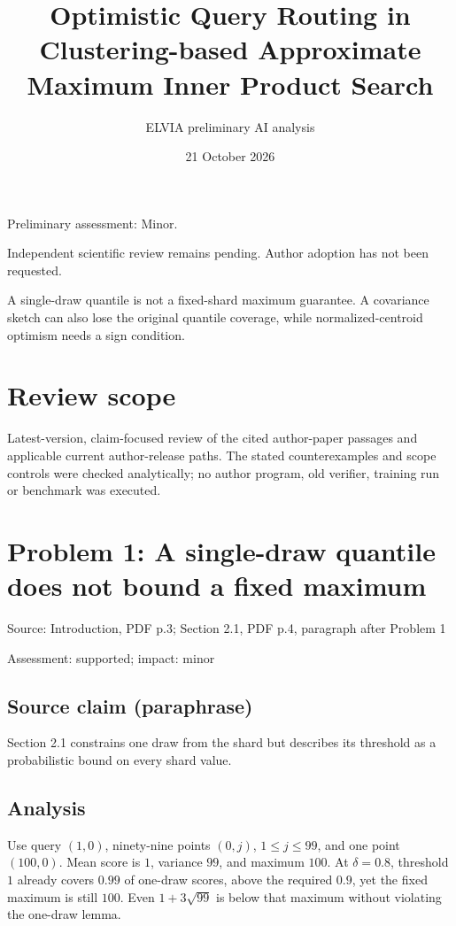 \documentclass[11pt]{article}
\begin{document}
\title{Optimistic Query Routing in Clustering-based Approximate Maximum Inner Product Search}

\author{ELVIA preliminary AI analysis}\date{21 October 2026}\maketitle

Preliminary assessment: Minor.\par

Independent scientific review remains pending. Author adoption has not been requested.

A single-draw quantile is not a fixed-shard maximum guarantee. A covariance sketch can also lose the original quantile coverage, while normalized-centroid optimism needs a sign condition.

\section*{Review scope}

Latest-version, claim-focused review of the cited author-paper passages and applicable current author-release paths. The stated counterexamples and scope controls were checked analytically; no author program, old verifier, training run or benchmark was executed.

\section*{Problem 1: A single-draw quantile does not bound a fixed maximum}

Source: Introduction, PDF p.3; Section 2.1, PDF p.4, paragraph after Problem 1

Assessment: supported; impact: minor

\subsection*{Source claim (paraphrase)}

Section 2.1 constrains one draw from the shard but describes its threshold as a probabilistic bound on every shard value.

\subsection*{Analysis}

Use query \((1,0)\), ninety-nine points \((0,j)\), \(1\leq j\leq99\), and one point \((100,0)\). Mean score is \(1\), variance \(99\), and maximum \(100\). At \(\delta=0.8\), threshold \(1\) already covers \(0.99\) of one-draw scores, above the required \(0.9\), yet the fixed maximum is still \(100\). Even \(1+3\sqrt{99}\) is below that maximum without violating the one-draw lemma.
\end{document}
